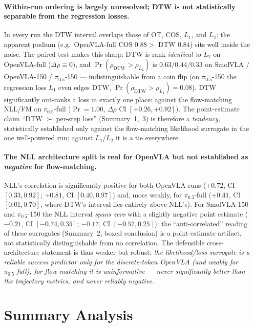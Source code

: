 \documentclass[11pt]{article}
\begin{document}
\paragraph{Within-run ordering is largely unresolved; DTW is not statistically separable from the
regression losses.} In every run the DTW interval overlaps those of OT, COS, $L_1$, and $L_2$; the
apparent podium (e.g.\ OpenVLA-full COS $0.88 >$ DTW $0.84$) sits well inside the noise. The paired test
makes this sharp: DTW is rank-\emph{identical} to $L_2$ on OpenVLA-full ($\Delta\rho\equiv0$), and
$\Pr(\rho_{\text{DTW}}>\rho_{L_2})$ is $0.63/0.44/0.33$ on SmolVLA / OpenVLA-150 / $\pi_{0.5}$-150 ---
indistinguishable from a coin flip (on $\pi_{0.5}$-150 the regression loss $L_1$ even edges DTW,
$\Pr(\rho_{\text{DTW}}>\rho_{L_1}){=}0.08$). DTW significantly out-ranks a loss in exactly one place: against the
flow-matching NLL/FM on $\pi_{0.5}$-full ($\Pr{=}1.00$, $\Delta\rho$ CI $[+0.26,+0.92]$). The
point-estimate claim ``DTW $\succ$ per-step loss'' (Summary~1,~3) is therefore a \emph{tendency},
statistically established only against the flow-matching likelihood surrogate in the one well-powered run;
against $L_1/L_2$ it is a tie everywhere.

\paragraph{The NLL architecture split is real for OpenVLA but not established as \emph{negative} for
flow-matching.} NLL's correlation is significantly positive for both OpenVLA runs
($+0.72$, CI $[0.33,0.92]$; $+0.81$, CI $[0.40,0.97]$) and, more weakly, for $\pi_{0.5}$-full
($+0.41$, CI $[0.01,0.70]$, where DTW's interval lies entirely above NLL's). For SmolVLA-150 and
$\pi_{0.5}$-150 the NLL interval \emph{spans zero} with a slightly negative point estimate ($-0.21$, CI
$[-0.74,0.35]$; $-0.17$, CI $[-0.57,0.25]$): the ``anti-correlated'' reading of these surrogates
(Summary~2, boxed conclusion) is a point-estimate artifact, not statistically distinguishable from no
correlation. The defensible cross-architecture statement is thus weaker but robust: \emph{the
likelihood/loss surrogate is a reliable success predictor only for the discrete-token OpenVLA (and weakly
for $\pi_{0.5}$-full); for flow-matching it is uninformative --- never significantly better than the
trajectory metrics, and never reliably negative.}

\section{Summary Analysis}
\end{document}
